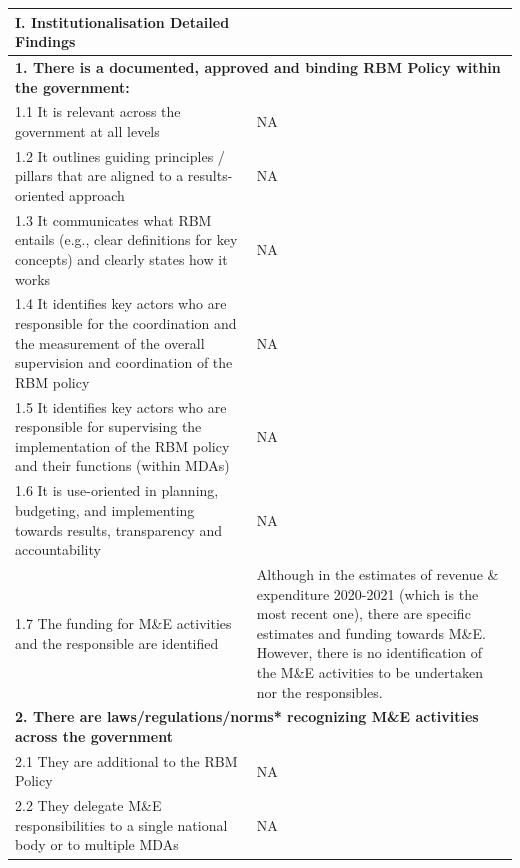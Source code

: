 \documentclass[
  10pt,
]{book}
\begin{document}
\begin{table}
\centering
\begin{tabular}[t]{l|l}
\hline
I. Institutionalisation Detailed Findings &  \\
\hline
\multicolumn{2}{l}{\textbf{1. There is a documented, approved and binding RBM Policy within the government:}}\\
\hline
\hspace{1em}1.1 It is relevant across the government at all levels & NA\\
\hline
\hspace{1em}1.2 It outlines guiding principles / pillars that are aligned to a results-oriented approach & NA\\
\hline
\hspace{1em}1.3 It communicates what RBM entails (e.g., clear definitions for key concepts) and clearly states how it works & NA\\
\hline
\hspace{1em}1.4 It identifies key actors who are responsible for the coordination and the measurement of the overall supervision and coordination of the RBM policy & NA\\
\hline
\hspace{1em}1.5 It identifies key actors who are responsible for supervising the implementation of the RBM policy and their functions (within MDAs) & NA\\
\hline
\hspace{1em}1.6 It is use-oriented in planning, budgeting, and implementing towards results, transparency and accountability & NA\\
\hline
\hspace{1em}1.7 The funding for M\&E activities and the responsible are identified & Although in the estimates of revenue \& expenditure 2020-2021 (which is the most recent one), there are specific estimates and funding towards M\&E. However, there is no identification of the M\&E activities to be undertaken nor the responsibles.\\
\hline
\multicolumn{2}{l}{\textbf{2. There are laws/regulations/norms* recognizing M\&E activities across the government}}\\
\hline
\hspace{1em}2.1 They are additional to the RBM Policy & NA\\
\hline
\hspace{1em}2.2 They delegate M\&E responsibilities to a single national body or to multiple MDAs & NA\\

\end{tabular}
\end{table}
\end{document}
